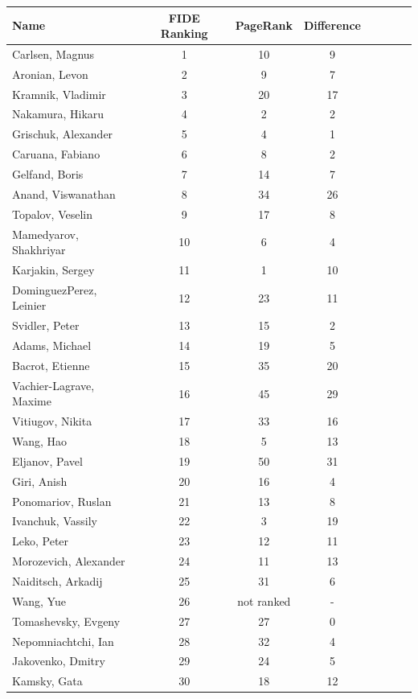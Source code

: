 \documentclass[pdftex,11pt,a4paper]{report}
\begin{document}
\begin{singlespace}
\begin{tabular}{l*{6}{c}r}
Name & FIDE Ranking & PageRank & Difference \\
\hline
Carlsen, Magnus & 1 & 10 & 9  \\ 
Aronian, Levon & 2 & 9 & 7  \\ 
Kramnik, Vladimir & 3 & 20 & 17  \\ 
Nakamura, Hikaru & 4 & 2 & 2  \\ 
Grischuk, Alexander & 5 & 4 & 1  \\ 
Caruana, Fabiano & 6 & 8 & 2  \\ 
Gelfand, Boris & 7 & 14 & 7  \\ 
Anand, Viswanathan & 8 & 34 & 26  \\ 
Topalov, Veselin & 9 & 17 & 8  \\ 
Mamedyarov, Shakhriyar & 10 & 6 & 4  \\ 
Karjakin, Sergey & 11 & 1 & 10  \\ 
DominguezPerez, Leinier & 12 & 23 & 11  \\ 
Svidler, Peter & 13 & 15 & 2  \\ 
Adams, Michael & 14 & 19 & 5  \\ 
Bacrot, Etienne & 15 & 35 & 20  \\ 
Vachier-Lagrave, Maxime & 16 & 45 & 29  \\ 
Vitiugov, Nikita & 17 & 33 & 16  \\ 
Wang, Hao & 18 & 5 & 13  \\ 
Eljanov, Pavel & 19 & 50 & 31  \\ 
Giri, Anish & 20 & 16 & 4  \\ 
Ponomariov, Ruslan & 21 & 13 & 8  \\ 
Ivanchuk, Vassily & 22 & 3 & 19  \\ 
Leko, Peter & 23 & 12 & 11  \\ 
Morozevich, Alexander & 24 & 11 & 13  \\ 
Naiditsch, Arkadij & 25 & 31 & 6  \\ 
Wang, Yue & 26 & not ranked & -  \\ 
Tomashevsky, Evgeny & 27 & 27 & 0  \\ 
Nepomniachtchi, Ian & 28 & 32 & 4  \\ 
Jakovenko, Dmitry & 29 & 24 & 5  \\ 
Kamsky, Gata & 30 & 18 & 12  \\ 

\end{tabular}
\end{singlespace}
\end{document}
